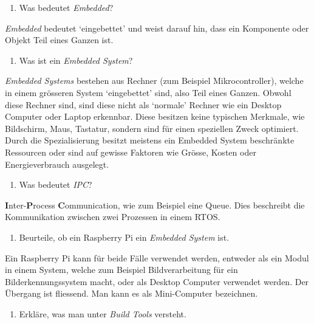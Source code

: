 \documentclass[
  10pt,
  a4paper,
]{article}
\providecommand{\tightlist}{%
  \setlength{\itemsep}{0pt}\setlength{\parskip}{0pt}}\usepackage{longtable,booktabs,array}
\numberwithin{equation}{section}
\begin{document}
\begin{enumerate}
\def\labelenumi{\arabic{enumi}.}
\tightlist
\item
  Was bedeutet \emph{Embedded}?
\end{enumerate}

\emph{Embedded} bedeutet `eingebettet' und weist darauf hin, dass ein
Komponente oder Objekt Teil eines Ganzen ist.

\begin{enumerate}
\def\labelenumi{\arabic{enumi}.}
\setcounter{enumi}{1}
\tightlist
\item
  Was ist ein \emph{Embedded System}?
\end{enumerate}

\emph{Embedded Systems} bestehen aus Rechner (zum Beispiel
Mikrocontroller), welche in einem grösseren System `eingebettet' sind,
also Teil eines Ganzen. Obwohl diese Rechner sind, sind diese nicht als
`normale' Rechner wie ein Desktop Computer oder Laptop erkennbar. Diese
besitzen keine typischen Merkmale, wie Bildschirm, Maus, Tastatur,
sondern sind für einen speziellen Zweck optimiert. Durch die
Spezialisierung besitzt meistens ein Embedded System beschränkte
Ressourcen oder sind auf gewisse Faktoren wie Grösse, Kosten oder
Energieverbrauch ausgelegt.

\begin{enumerate}
\def\labelenumi{\arabic{enumi}.}
\setcounter{enumi}{2}
\tightlist
\item
  Was bedeutet \emph{IPC}?
\end{enumerate}

\textbf{I}nter-\textbf{P}rocess \textbf{C}ommunication, wie zum Beispiel
eine Queue. Dies beschreibt die Kommunikation zwischen zwei Prozessen in
einem RTOS.

\begin{enumerate}
\def\labelenumi{\arabic{enumi}.}
\setcounter{enumi}{3}
\tightlist
\item
  Beurteile, ob ein Raspberry Pi ein \emph{Embedded System} ist.
\end{enumerate}

Ein Raspberry Pi kann für beide Fälle verwendet werden, entweder als ein
Modul in einem System, welche zum Beispiel Bildverarbeitung für ein
Bilderkennungssystem macht, oder als Desktop Computer verwendet werden.
Der Übergang ist fliessend. Man kann es als Mini-Computer bezeichnen.

\begin{enumerate}
\def\labelenumi{\arabic{enumi}.}
\setcounter{enumi}{4}
\tightlist
\item
  Erkläre, was man unter \emph{Build Tools} versteht.
\end{enumerate}
\end{document}

